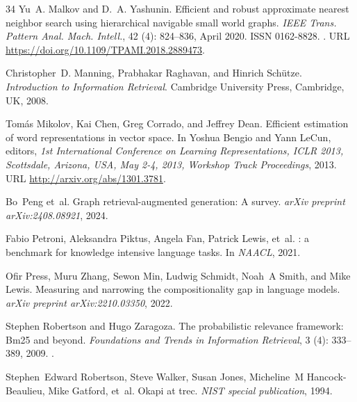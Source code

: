\begin{thebibliography}{34}
Yu~A. Malkov and D.~A. Yashunin.
\newblock Efficient and robust approximate nearest neighbor search using hierarchical navigable small world graphs.
\newblock \emph{IEEE Trans. Pattern Anal. Mach. Intell.}, 42 (4): 824–836, April 2020.
\newblock ISSN 0162-8828.
\newblock {}.
\newblock URL \url{https://doi.org/10.1109/TPAMI.2018.2889473}.

Christopher~D. Manning, Prabhakar Raghavan, and Hinrich Sch{\"u}tze.
\newblock \emph{Introduction to Information Retrieval}.
\newblock Cambridge University Press, Cambridge, UK, 2008.

Tom{\'{a}}s Mikolov, Kai Chen, Greg Corrado, and Jeffrey Dean.
\newblock Efficient estimation of word representations in vector space.
\newblock In Yoshua Bengio and Yann LeCun, editors, \emph{1st International Conference on Learning Representations, {ICLR} 2013, Scottsdale, Arizona, USA, May 2-4, 2013, Workshop Track Proceedings}, 2013.
\newblock URL \url{http://arxiv.org/abs/1301.3781}.

Bo~Peng et~al.
\newblock Graph retrieval-augmented generation: A survey.
\newblock \emph{arXiv preprint arXiv:2408.08921}, 2024.

Fabio Petroni, Aleksandra Piktus, Angela Fan, Patrick Lewis, et~al.
: a benchmark for knowledge intensive language tasks.
\newblock In \emph{NAACL}, 2021.

Ofir Press, Muru Zhang, Sewon Min, Ludwig Schmidt, Noah~A Smith, and Mike Lewis.
\newblock Measuring and narrowing the compositionality gap in language models.
\newblock \emph{arXiv preprint arXiv:2210.03350}, 2022.

Stephen Robertson and Hugo Zaragoza.
\newblock The probabilistic relevance framework: Bm25 and beyond.
\newblock \emph{Foundations and Trends in Information Retrieval}, 3 (4): 333--389, 2009.
\newblock {}.

Stephen~Edward Robertson, Steve Walker, Susan Jones, Micheline~M Hancock-Beaulieu, Mike Gatford, et~al.
\newblock Okapi at trec.
\newblock \emph{NIST special publication}, 1994.


\end{thebibliography}
